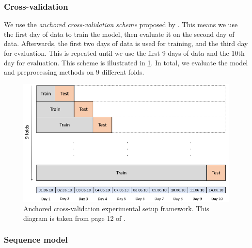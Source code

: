 \documentclass{statsmsc}
\begin{document}
{\subsubsection{Cross-validation}%
\label{ssub:Cross-validation}

We use the \textit{anchored cross-validation scheme}  proposed by \cite{lob-data}.
This means we use the first day of data to train the model, then evaluate it on the second
day of data. Afterwards, the first two days of data is used for training, and the third day
for evaluation. This is repeated until we use the first 9 days of data and the 10th day for evaluation. This scheme is illustrated in \cref{fig:lob_anchor}.
In total, we evaluate the model and preprocessing methods on 9 different folds.

\begin{figure}
\begin{center}
    \includegraphics[width=\textwidth]{diagrams/lob_cross_val_diagram.pdf}
\end{center}
\caption{Anchored cross-validation experimental setup framework. This diagram is taken from
page 12 of \cite{lob-data}.}
\label{fig:lob_anchor}
\end{figure}

\subsubsection{Sequence model}%
\label{ssub:Sequencemodel2}

}
\end{document}

